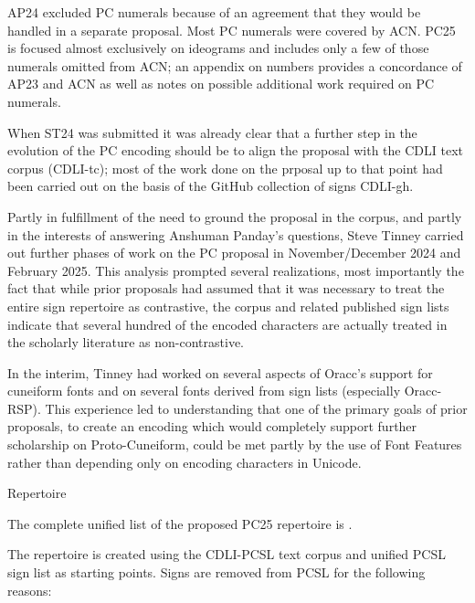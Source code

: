 \par AP24 excluded PC numerals because of an agreement that they
      would be handled in a separate proposal.  Most PC numerals were
      covered by ACN.  PC25 is focused almost exclusively on ideograms
      and includes only a few of those numerals omitted from ACN; an
      appendix on numbers provides a concordance of AP23 and ACN as
      well as notes on possible additional work required on PC
      numerals.


\par When ST24 was submitted it was already clear that a further
      step in the evolution of the PC encoding should be to align the
      proposal with the CDLI text corpus (CDLI-tc); most of the work
      done on the prposal up to that point had been carried out on the
      basis of the GitHub collection of signs CDLI-gh.


\par Partly in fulfillment of the need to ground the proposal in
      the corpus, and partly in the interests of answering Anshuman
      Panday's questions, Steve Tinney carried out further phases of
      work on the PC proposal in November/December 2024 and February
      2025.  This analysis prompted several realizations, most importantly
      the fact that while prior proposals had assumed that it was
      necessary to treat the entire sign repertoire as contrastive,
      the corpus and related published sign lists indicate that
      several hundred of the encoded characters are actually treated
      in the scholarly literature as non-contrastive.


\par In the interim, Tinney had worked on several aspects of
      Oracc's support for cuneiform fonts and on several fonts derived
      from sign lists (especially Oracc-RSP).  This experience led to
      understanding that one of the primary goals of prior proposals,
      to create an encoding which would completely support further
      scholarship on Proto-Cuneiform, could be met partly by the use
      of Font Features rather than depending only on encoding
      characters in Unicode.

\Hh{}Repertoire


\par The complete unified list of the proposed PC25 repertoire is
      .


\par The repertoire is created using the CDLI-PCSL text corpus and
      unified PCSL sign list as starting points.  Signs are removed
      from PCSL for the following reasons:

